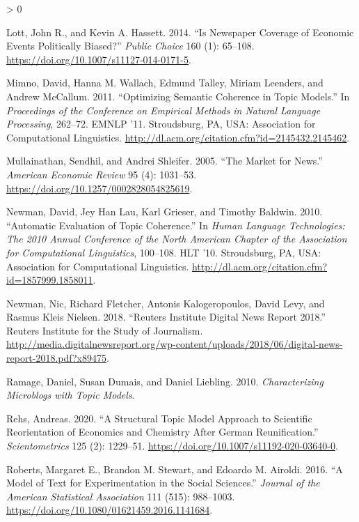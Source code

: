 \documentclass[
  12pt,
]{article}
\newlength{\cslhangindent}
\newenvironment{CSLReferences}[2] %
 {%
  \setlength{\parindent}{0pt}
  \ifodd #1 \everypar{\setlength{\hangindent}{\cslhangindent}}\ignorespaces\fi
  \ifnum #2 > 0
  \setlength{\parskip}{#2\baselineskip}
  \fi
 }%
 {}
\begin{document}
\begin{CSLReferences}{1}{0}
\leavevmode\hypertarget{ref-lott_is_2014}{}%
Lott, John R., and Kevin A. Hassett. 2014. {``Is Newspaper Coverage of
Economic Events Politically Biased?''} \emph{Public Choice} 160 (1):
65--108. \url{https://doi.org/10.1007/s11127-014-0171-5}.

\leavevmode\hypertarget{ref-mimno_optimizing_2011}{}%
Mimno, David, Hanna M. Wallach, Edmund Talley, Miriam Leenders, and
Andrew McCallum. 2011. {``Optimizing Semantic Coherence in Topic
Models.''} In \emph{Proceedings of the Conference on Empirical Methods
in Natural Language Processing}, 262--72. {EMNLP} '11. Stroudsburg,
{PA}, {USA}: Association for Computational Linguistics.
\url{http://dl.acm.org/citation.cfm?id=2145432.2145462}.

\leavevmode\hypertarget{ref-mullainathan_market_2005}{}%
Mullainathan, Sendhil, and Andrei Shleifer. 2005. {``The Market for
News.''} \emph{American Economic Review} 95 (4): 1031--53.
\url{https://doi.org/10.1257/0002828054825619}.

\leavevmode\hypertarget{ref-newman_automatic_2010}{}%
Newman, David, Jey Han Lau, Karl Grieser, and Timothy Baldwin. 2010.
{``Automatic Evaluation of Topic Coherence.''} In \emph{Human Language
Technologies: The 2010 Annual Conference of the North American Chapter
of the Association for Computational Linguistics}, 100--108. {HLT} '10.
Stroudsburg, {PA}, {USA}: Association for Computational Linguistics.
\url{http://dl.acm.org/citation.cfm?id=1857999.1858011}.

\leavevmode\hypertarget{ref-newman_reuters_2018}{}%
Newman, Nic, Richard Fletcher, Antonis Kalogeropoulos, David Levy, and
Rasmus Kleis Nielsen. 2018. {``Reuters Institute Digital News Report
2018.''} Reuters Institute for the Study of Journalism.
\url{http://media.digitalnewsreport.org/wp-content/uploads/2018/06/digital-news-report-2018.pdf?x89475}.

\leavevmode\hypertarget{ref-ramage_characterizing_2010}{}%
Ramage, Daniel, Susan Dumais, and Daniel Liebling. 2010.
\emph{Characterizing Microblogs with Topic Models}.

\leavevmode\hypertarget{ref-rehs_structural_2020}{}%
Rehs, Andreas. 2020. {``A Structural Topic Model Approach to Scientific
Reorientation of Economics and Chemistry After German Reunification.''}
\emph{Scientometrics} 125 (2): 1229--51.
\url{https://doi.org/10.1007/s11192-020-03640-0}.

\leavevmode\hypertarget{ref-roberts_model_2016}{}%
Roberts, Margaret E., Brandon M. Stewart, and Edoardo M. Airoldi. 2016.
{``A Model of Text for Experimentation in the Social Sciences.''}
\emph{Journal of the American Statistical Association} 111 (515):
988--1003. \url{https://doi.org/10.1080/01621459.2016.1141684}.


\end{CSLReferences}
\end{document}
